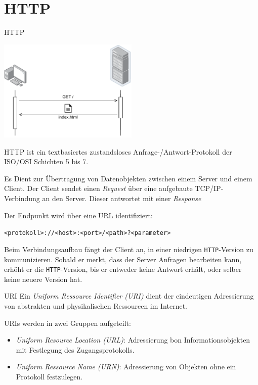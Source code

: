 \section{HTTP}

\begin{defi}{HTTP}
    \begin{center}
        \includegraphics[width=0.5\textwidth]{includes/figures/defi_http.pdf}
    \end{center}

    HTTP ist ein textbasiertes zustandsloses Anfrage-/Antwort-Protokoll der ISO/OSI Schichten 5 bis 7.

    Es Dient zur Übertragung von Datenobjekten zwischen einem Server und einem Client.
    Der Client sendet einen \emph{Request} über eine aufgebaute TCP/IP-Verbindung an den Server.
    Dieser antwortet mit einer \emph{Response}

    Der Endpunkt wird über eine URL identifiziert:

    \texttt{<protokoll>://<host>:<port>/<path>?<parameter>}

    Beim Verbindungsaufbau fängt der Client an, in einer niedrigen \texttt{HTTP}-Version zu kommunizieren.
    Sobald er merkt, dass der Server Anfragen bearbeiten kann, erhöht er die \texttt{HTTP}-Version, bis er entweder keine Antwort erhält, oder selber keine neuere Version hat.
\end{defi}

\begin{defi}{URI}
    Ein \emph{Uniform Ressource Identifier (URI)} dient der eindeutigen Adressierung von abstrakten und physikalischen Ressourcen im Internet.

    URIs werden in zwei Gruppen aufgeteilt:
    \begin{itemize}
        \item \emph{Uniform Resource Location (URL)}: Adressierung bon Informationsobjekten mit Festlegung des Zugangsprotokolls.
        \item \emph{Uniform Ressource Name (URN)}: Adressierung von Objekten ohne ein Protokoll festzulegen.
    \end{itemize}
\end{defi}

